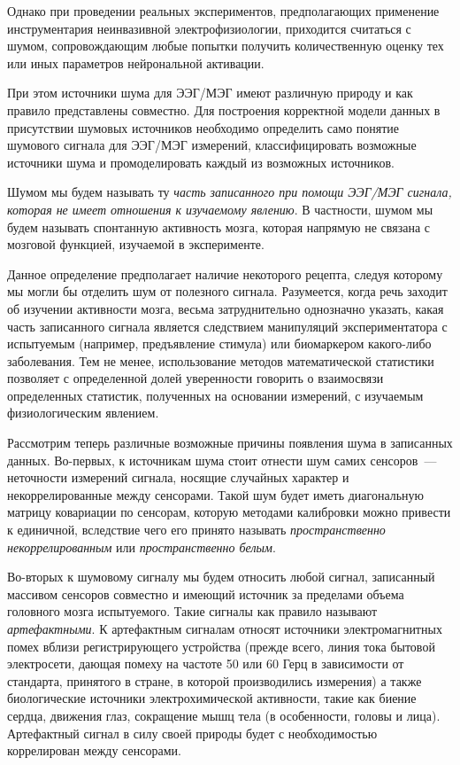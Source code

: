 Однако при проведении реальных экспериментов, предполагающих применение инструментария неинвазивной электрофизиологии,
приходится считаться с шумом, сопровождающим любые попытки получить количественную оценку тех
или иных параметров нейрональной активации.

При этом источники шума для ЭЭГ/МЭГ имеют различную природу и как правило представлены совместно.
Для построения корректной модели данных в присутствии шумовых источников необходимо определить
само понятие шумового сигнала для ЭЭГ/МЭГ измерений, классифицировать возможные источники шума и
промоделировать каждый из возможных источников.

Шумом мы будем называть ту
\emph{часть записанного при помощи ЭЭГ/МЭГ сигнала, которая не имеет отношения к изучаемому явлению}.
В частности, шумом мы будем называть спонтанную активность мозга, которая напрямую не связана с мозговой
функцией, изучаемой в эксперименте.

Данное определение предполагает наличие некоторого рецепта,
следуя которому мы могли бы отделить шум от полезного сигнала.
Разумеется, когда речь заходит об изучении активности мозга, весьма затруднительно однозначно указать,
какая часть записанного сигнала является следствием манипуляций экспериментатора с испытуемым
(например, предъявление стимула) или биомаркером какого-либо заболевания.
Тем не менее, использование методов математической статистики позволяет с определенной
долей уверенности говорить о взаимосвязи определенных статистик, полученных на основании
измерений, с изучаемым физиологическим явлением.

Рассмотрим теперь различные возможные причины появления шума в записанных данных.
Во-первых, к источникам шума стоит отнести шум самих сенсоров~--- неточности измерений сигнала,
носящие случайных характер и некоррелированные между сенсорами. Такой шум будет иметь диагональную
матрицу ковариации по сенсорам, которую методами калибровки можно привести к единичной,
вследствие чего его принято называть \emph{пространственно некоррелированным} или \emph{пространственно белым}.

Во-вторых к шумовому сигналу мы будем относить любой сигнал, записанный массивом сенсоров совместно и
имеющий источник за пределами объема головного мозга испытуемого. Такие сигналы как правило называют
\emph{артефактными}. К артефактным сигналам относят источники электромагнитных помех
вблизи регистрирующего устройства
(прежде всего, линия тока бытовой электросети, дающая помеху на частоте 50 или 60 Герц в зависимости от стандарта,
принятого в стране, в которой производились измерения) а также биологические источники электрохимической активности,
такие как биение сердца, движения глаз, сокращение мышц тела (в особенности, головы и лица).
Артефактный сигнал в силу своей природы будет с необходимостью коррелирован между сенсорами.




